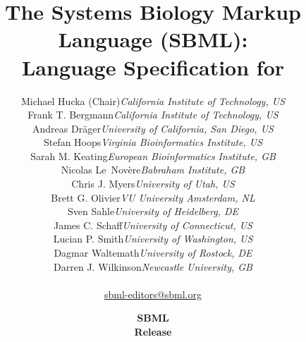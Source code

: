 
\title{{The Systems Biology Markup Language (SBML):}\\
Language Specification for \thisLV}

\author{\begin{tabular}{l>{\hspace*{15pt}}r}
Michael Hucka (Chair)	& \emph{California Institute of Technology, US}\\
Frank T. Bergmann  	& \emph{California Institute of Technology, US}\\
Andreas Dr{\"a}ger  	& \emph{University of California, San Diego, US}\\
Stefan Hoops		& \emph{Virginia Bioinformatics Institute, US}\\
Sarah M. Keating	& \emph{European Bioinformatics Institute, GB}\\
Nicolas Le~Nov\`{e}re	& \emph{Babraham Institute, GB}\\
Chris J. Myers		& \emph{University of Utah, US}\\
Brett G. Olivier	& \emph{VU University Amsterdam, NL}\\
Sven Sahle		& \emph{University of Heidelberg, DE}\\
James C. Schaff		& \emph{University of Connecticut, US}\\
Lucian P. Smith		& \emph{University of Washington, US}\\
Dagmar Waltemath	& \emph{University of Rostock, DE}\\
Darren J. Wilkinson	& \emph{Newcastle University, GB}\\[8pt]
\end{tabular}\\
\href{mailto:sbml-editors@sbml.org}{\sffamily sbml-editors@sbml.org}}

\date{\vfill \textbf{SBML \thisLV} \\[10pt]
  \textbf{Release \sbmlrelease} \\[10pt]
  \sbmldate}



